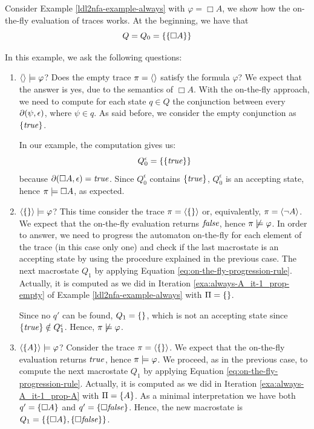 \begin{example}\label{exa:on-the-fly-always-A}
	Consider Example \ref{ldl2nfa-example-always} with $\varphi = \Box A$, we show how the on-the-fly evaluation of traces works.
	At the beginning, we have that $$Q = Q_0 = \{\{\Box A\}\}$$

	In this example, we ask the following questions:
	\begin{enumerate}
		\item $\langle  \rangle \models \varphi$? Does the empty trace $\pi = \langle  \rangle$ satisfy the formula $\varphi$? We expect that the answer is yes, due to the semantics of $\Box A$. With the on-the-fly approach, we need to compute for each \NFA state $q \in Q$ the conjunction between every $\partial\lparen \psi, \epsilon\rparen$, where $\psi \in q$. As said before, we consider the empty conjunction as $\{\mathit{true}\}$.
		
		In our example, the computation gives us:
		$$Q_0^\epsilon = \{\{\mathit{true}\}\}$$
		because $\partial\lparen \Box A, \epsilon\rparen = \mathit{true}$.
		Since $Q_0^\epsilon$ contains $\{\mathit{true}\}$, $Q_0^\epsilon$ is an accepting state, hence $\pi \models \Box A$, as expected.
		
		\item $\langle \{\} \rangle \models \varphi$? This time consider the trace $\pi = \langle \{\} \rangle$ or, equivalently, $\pi = \langle \lnot A \rangle$. We expect that the on-the-fly evaluation returns $\mathit{false}$, hence $\pi \not \models \varphi$. In order to answer, we need to progress the automaton on-the-fly for each element of the trace (in this case only one) and check if the last macrostate is an accepting state by using the procedure explained in the previous case.
		The next macrostate $Q_1$ by applying Equation \ref{eq:on-the-fly-progression-rule}. Actually, it is computed as we did in Iteration \ref{exa:always-A_it-1_prop-empty} of Example \ref{ldl2nfa-example-always} with $\Pi = \{\}$. 
		
		Since no $q'$ can be found, $Q_1 = \{\}$, which is not an accepting state since $\{\mathit{true}\} \notin Q_1^\epsilon$. Hence, $\pi \not \models \varphi$.\label{exa:on-the-fly-always-A-trace-false}
		
		\item \label{exa:on-the-fly-always-A-trace-A} $\langle \{A\} \rangle \models \varphi$? Consider the trace $\pi = \langle \{\} \rangle$. We expect that the on-the-fly evaluation returns $\mathit{true}$, hence $\pi \models \varphi$. We proceed, as in the previous case, to compute the next macrostate $Q_1$ by applying Equation \ref{eq:on-the-fly-progression-rule}. Actually, it is computed as we did in Iteration \ref{exa:always-A_it-1_prop-A} with $\Pi = \{A\}$. As a minimal interpretation we have both $q' = \{\Box A\}$ and $q' = \{\Box \mathit{false}\}$. Hence, the new macrostate is $Q_1 = \{\{\Box A\}, \{\Box \mathit{false}\}\}$.
		

\end{enumerate}
\end{example}
